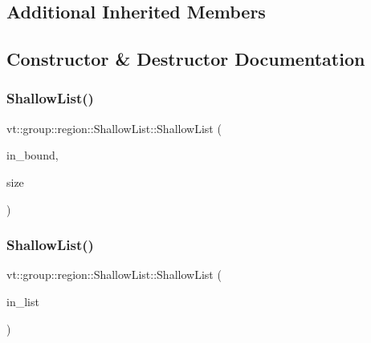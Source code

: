 \subsection*{Additional Inherited Members}


\subsection{Constructor \& Destructor Documentation}
\mbox{\label{structvt_1_1group_1_1region_1_1_shallow_list_a603d4964e6b51c9883b3f7ef1f7de997}} 
\subsubsection{\texorpdfstring{Shallow\+List()}{ShallowList()}\hspace{0.1cm}{\footnotesize\ttfamily [1/5]}}
{\footnotesize\ttfamily vt\+::group\+::region\+::\+Shallow\+List\+::\+Shallow\+List (\begin{DoxyParamCaption}\item[{\hyperlink{structvt_1_1group_1_1region_1_1_region_abf426ff85bed72c1c6524fad6a9f1751}{Bound\+Type} const $\ast$}]{in\+\_\+bound,  }\item[{\hyperlink{structvt_1_1group_1_1region_1_1_region_a9bb381adf31111aae34dbc644bad6c1f}{Size\+Type} const \&}]{size }\end{DoxyParamCaption})}

\mbox{\label{structvt_1_1group_1_1region_1_1_shallow_list_a205b74129dffd8801bb6ad62614850bf}} 
\subsubsection{\texorpdfstring{Shallow\+List()}{ShallowList()}\hspace{0.1cm}{\footnotesize\ttfamily [2/5]}}
{\footnotesize\ttfamily vt\+::group\+::region\+::\+Shallow\+List\+::\+Shallow\+List (\begin{DoxyParamCaption}\item[{\hyperlink{structvt_1_1group_1_1region_1_1_list}{List} const \&}]{in\+\_\+list }\end{DoxyParamCaption})\hspace{0.3cm}{\ttfamily [explicit]}}

